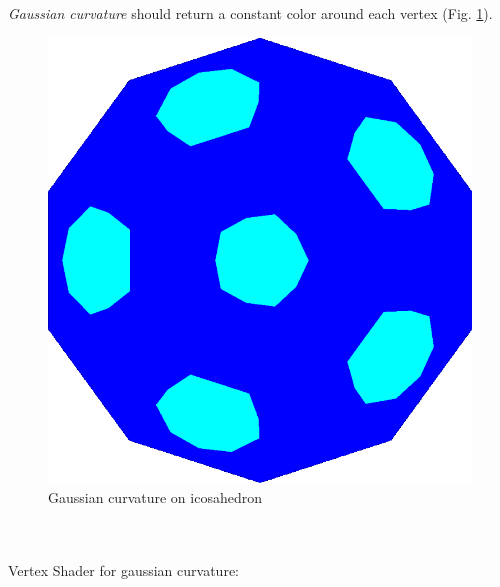 \textit{Gaussian curvature} should return a constant color around each vertex (Fig. \ref{fig:gc-icosahedron}).
\begin{figure}[h]
    \centering
    \includegraphics[scale=0.2]{images/gaussian-ball.png}
    \caption{Gaussian curvature on icosahedron}\label{fig:gc-icosahedron}
\end{figure}
\\
\\
Vertex Shader for gaussian curvature:
